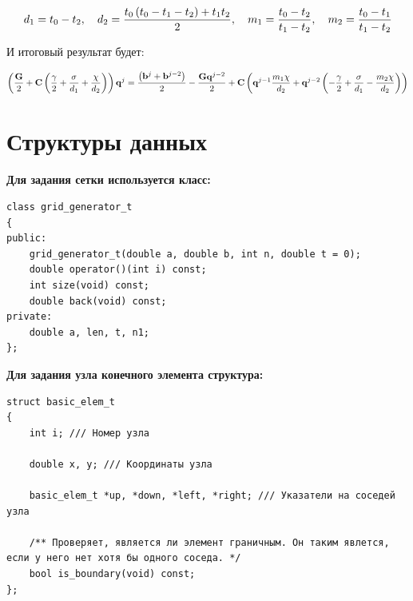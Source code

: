 $$ d_1 = t_0-t_2, \quad d_2 = \frac{t_0\left(t_0-t_1-t_2\right) + t_1 t_2}{2}, \quad m_1 = \frac{t_0-t_2}{t_1-t_2}, \quad m_2 = \frac{t_0-t_1}{t_1-t_2} $$ 

И итоговый результат будет:

$$ \left(\frac{\mathbf{G}}{2} + \mathbf{C}\left(\frac{\gamma}{2} + \frac{\sigma}{d_1} + \frac{\chi}{d_2}\right)\right)\mathbf{q}^j = \frac{\left(\mathbf{b}^j+\mathbf{b}^{j-2}\right)}{2} - \frac{\mathbf{G}\mathbf{q}^{j-2}}{2} + \mathbf{C}\left(\mathbf{q}^{j-1}\frac{m_1\chi}{d_2} + \mathbf{q}^{j-2}\left(-\frac{\gamma}{2}+\frac{\sigma}{d_1}-\frac{m_2\chi}{d_2}\right)\right) $$

\section{Структуры данных}

\noindent\textbf{Для задания сетки используется класс:}

\begin{tcolorbox}[
	colback=white,
	colframe=black!30!white,
	boxrule=0.5pt, 
	listing only,
	left=-0.5mm,
	leftrule=4mm,
	arc=2mm, outer arc=2mm,
	top=0pt,
	bottom=0pt,
	enhanced jigsaw,
	coltitle=black, 
	fonttitle=\bfseries\ttfamily,
	break at=-\baselineskip/0pt/\textheight, 
]
\begin{verbatim}
class grid_generator_t
{
public:
    grid_generator_t(double a, double b, int n, double t = 0);
    double operator()(int i) const;
    int size(void) const;
    double back(void) const;
private:
    double a, len, t, n1;
};
\end{verbatim}
\end{tcolorbox} 

\noindent\textbf{Для задания узла конечного элемента структура:}

\begin{tcolorbox}[
	colback=white,
	colframe=black!30!white,
	boxrule=0.5pt, 
	listing only,
	left=-0.5mm,
	leftrule=4mm,
	arc=2mm, outer arc=2mm,
	top=0pt,
	bottom=0pt,
	enhanced jigsaw,
	coltitle=black, 
	fonttitle=\bfseries\ttfamily,
	break at=-\baselineskip/0pt/\textheight, 
]
\begin{verbatim}
struct basic_elem_t
{
    int i; /// Номер узла

    double x, y; /// Координаты узла

    basic_elem_t *up, *down, *left, *right; /// Указатели на соседей узла

    /** Проверяет, является ли элемент граничным. Он таким явлется, если у него нет хотя бы одного соседа. */
    bool is_boundary(void) const;
};
\end{verbatim}
\end{tcolorbox} 

